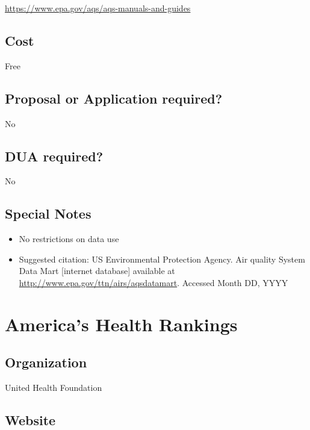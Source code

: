 \documentclass[
]{book}
\providecommand{\tightlist}{%
  \setlength{\itemsep}{0pt}\setlength{\parskip}{0pt}}
\begin{document}
\url{https://www.epa.gov/aqs/aqs-manuals-and-guides}

\hypertarget{cost}{%
\section{Cost}\label{cost}}

Free

\hypertarget{proposal-or-application-required}{%
\section{Proposal or Application required?}\label{proposal-or-application-required}}

No

\hypertarget{dua-required}{%
\section{DUA required?}\label{dua-required}}

No

\hypertarget{special-notes}{%
\section{Special Notes}\label{special-notes}}

\begin{itemize}
\tightlist
\item
  No restrictions on data use
\item
  Suggested citation: US Environmental Protection Agency. Air quality System Data Mart {[}internet database{]} available at \url{http://www.epa.gov/ttn/airs/aqsdatamart}. Accessed Month DD, YYYY
\end{itemize}

\mainmatter

\hypertarget{americas-health-rankings}{%
\chapter{America's Health Rankings}\label{americas-health-rankings}}

\hypertarget{organization-1}{%
\section{Organization}\label{organization-1}}

United Health Foundation

\hypertarget{website-1}{%
\section{Website}\label{website-1}}
\end{document}
